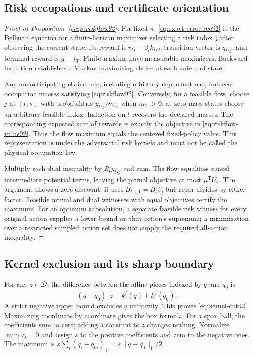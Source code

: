 \subsection{Risk occupations and certificate orientation}
\begin{proof}[Proof of Proposition~\ref{prop:riskflow92}]
For fixed $\pi$, \eqref{eq:exact-error-rec92} is the Bellman equation for a finite-horizon maximizer selecting a risk index $j$ after observing the current state. Its reward is $r_{ts}-\beta_tk_{tsj}$, transition vector is $q_{tsj}$, and terminal reward is $g-f_T$. Finite maxima have measurable maximizers. Backward induction establishes a Markov maximizing choice at each date and state.

Any nonanticipating choice rule, including a history-dependent one, induces occupation masses satisfying \eqref{eq:riskflow92}. Conversely, for a feasible flow, choose $j$ at $(t,s)$ with probabilities $y_{tsj}/m_{ts}$ when $m_{ts}>0$; at zero-mass states choose an arbitrary feasible index. Induction on $t$ recovers the declared masses. The corresponding expected sum of rewards is exactly the objective in \eqref{eq:riskflow-value92}. Thus the flow maximum equals the centered fixed-policy value. This representation is under the adversarial risk kernels and must not be called the physical occupation law.

Multiply each dual inequality by $B_ty_{tsj}$ and sum. The flow equalities cancel intermediate potential terms, leaving the primal objective at most $\mu^{\mathsf T}U_0$. The argument allows a zero discount: it uses $B_{t+1}=B_t\beta_t$ but never divides by either factor. Feasible primal and dual witnesses with equal objectives certify the maximum. For an optimum subsolution, a separate feasible risk witness for every original action supplies a lower bound on that action's supremum; a minimization over a restricted sampled action set does not supply the required all-action inequality.
\end{proof}

\subsection{Kernel exclusion and its sharp boundary}
For any $z\in\mathcal D$, the difference between the affine pieces indexed by $q$ and $q_0$ is
\[
 (q-q_0)^{\mathsf T}z-k^f(q)+k^f(q_0).
\]
A strict negative upper bound excludes $q$ uniformly. This proves \eqref{eq:kernel-cut92}. Maximizing coordinate by coordinate gives the box formula. For a span ball, the coefficients sum to zero; adding a constant to $z$ changes nothing. Normalize $\min_i z_i=0$ and assign $s$ to the positive coefficients and zero to the negative ones. The maximum is $s\sum_i(q_i-q_{0i})_+=s\|q-q_0\|_1/2$.

